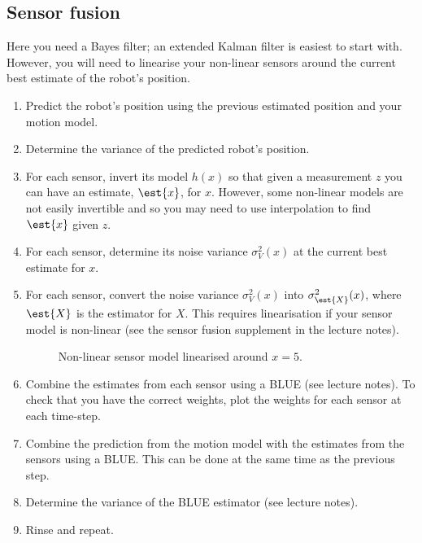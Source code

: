 \documentclass[a4paper, 12]{article}
\renewcommand{\var}[1]{\sigma_{#1}^2}
\begin{document}
\subsection{Sensor fusion}


Here you need a Bayes filter; an extended Kalman filter is easiest to
start with.  However, you will need to linearise your non-linear
sensors around the current best estimate of the robot's position.

\begin{enumerate}
\item Predict the robot's position using the previous estimated
  position and your motion model.

\item Determine the variance of the predicted robot's position.  
  
\item For each sensor, invert its model $h(x)$ so that given a
  measurement $z$ you can have an estimate, $\est{x}$, for $x$.
  However, some non-linear models are not easily invertible and so you
  may need to use interpolation to find $\est{x}$ given $z$.

\item For each sensor, determine its noise variance $\var{V}(x)$ at
  the current best estimate for $x$.

\item For each sensor, convert the noise variance $\var{V}(x)$ into
  $\var{\est{X}}(x)$, where $\est{X}$ is the estimator for $X$.  This
  requires linearisation if your sensor model is non-linear (see the
  sensor fusion supplement in the lecture notes).

  \begin{figure}[!h]
  \centering
  
  \caption{Non-linear sensor model linearised around $x=5$.}
  \label{fig:linearised}
  \end{figure}
  
\item Combine the estimates from each sensor using a BLUE (see lecture
  notes).  To check that you have the correct weights, plot the
  weights for each sensor at each time-step.

\item Combine the prediction from the motion model with the estimates
  from the sensors using a BLUE.  This can be done at the same time as
  the previous step.

\item Determine the variance of the BLUE estimator (see lecture
  notes).

\item Rinse and repeat.
\end{enumerate}
\end{document}
